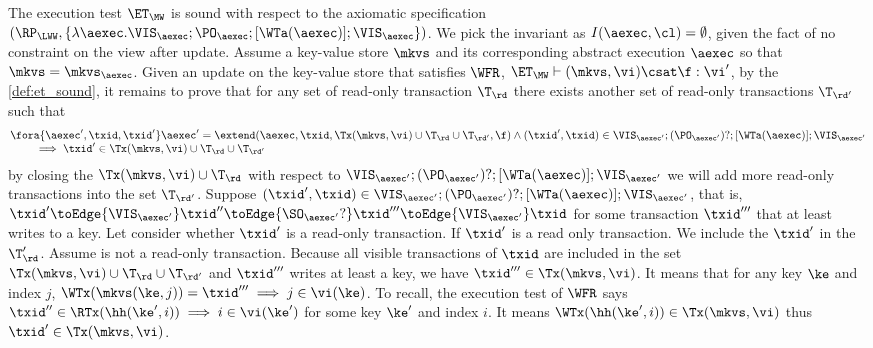 The execution test $\ET_\MW$ is sound with respect to the axiomatic specification 
\( (\RP_{\LWW}, \{\lambda \aexec. \VIS_\aexec ; \PO_{\aexec} ; [\WTa(\aexec)] ; \VIS_{\aexec} \})\).
We pick the invariant as \( I( \aexec, \cl ) = \emptyset \), given the fact of no constraint on the view after update.
Assume a key-value store \( \mkvs \) and its corresponding abstract execution \( \aexec \) so that \( \mkvs = \mkvs_\aexec \).
Given an update on the key-value store that satisfies \( \WFR \), \ie \(\ET_\MW \vdash (\mkvs, \vi) \csat \f : \vi' \),
by the \cref{def:et_sound}, it remains to prove that for any set of read-only transaction \( \T_{\rd} \) there exists another set of read-only transactions \( \T_{\rd'} \) such that
\[
    \begin{array}{@{}l@{}}
        \fora{ \aexec', \txid, \txid' } 
        \aexec' = \extend(\aexec, \txid, \Tx(\mkvs, \vi) \cup \T_\rd \cup \T_{\rd'}, \f ) 
        \land (\txid' ,\txid)  \in \VIS_{\aexec'} ; (\PO_{\aexec'})? ; [\WTa(\aexec)] ; \VIS_{\aexec'}   \\
        \qquad {} \implies \txid' \in \Tx(\mkvs, \vi) \cup \T_\rd \cup \T_{\rd'}
    \end{array}
\]
by closing the \( \Tx(\mkvs, \vi) \cup \T_\rd \) with respect to \(\VIS_{\aexec'} ; (\PO_{\aexec'})? ; [\WTa(\aexec)] ; \VIS_{\aexec'} \)
we will add more read-only transactions into the set \( \T_{\rd'}\).
Suppose \( (\txid' ,\txid)  \in \VIS_{\aexec'} ; (\PO_{\aexec'})? ; [\WTa(\aexec)] ; \VIS_{\aexec'} \), 
that is, \( \txid' \toEdge{\VIS_{\aexec'}} \txid'' \toEdge{\SO_{\aexec'}?} \txid''' \toEdge{\VIS_{\aexec'}} \txid \) for some transaction \( \txid''' \) that at least writes to a key.
Let consider whether \( \txid' \) is a read-only transaction.
If \( \txid' \) is a read only transaction.
We include the \( \txid' \) in the \( \T'_\rd \).
Assume is not a read-only transaction.
Because all visible transactions of \( \txid \) are included in the set \( \Tx(\mkvs, \vi) \cup \T_\rd \cup \T_{\rd'} \) and \( \txid''' \) writes at least a key, we have \( \txid''' \in \Tx(\mkvs, \vi) \).
It means that for any key \( \ke \) and index \( j \), \( \WTx(\mkvs(\ke, j))  = \txid''' \implies j \in \vi(\ke)\).
To recall, the execution test of \( \WFR \) says \( \txid'' \in \RTx(\hh(\ke', i)) \implies i \in \vi(\ke') \) for some key \( \ke' \) and index \( i \).
It means \( \WTx(\hh(\ke', i)) \in \Tx(\mkvs, \vi) \) thus \( \txid' \in \Tx(\mkvs, \vi) \).



